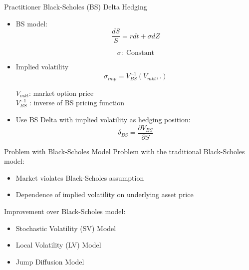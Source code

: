 \documentclass[10pt,table,mathserif]{beamer}
\begin{document}
\begin{frame}{Practitioner Black-Scholes (BS) Delta Hedging}
\begin{itemize}
  \item BS model:
\[
\frac{d S}{ S}= r dt +\sigma dZ
\]

\[
\sigma:\; \text{Constant}
\]
\item Implied volatility
  \[
  \sigma_{imp}=V_{BS}^{-1}(V_{mkt},.)
  \]
  \begin{center}
  $V_{mkt}$: market option price \\ $V_{BS}^{-1}$ : inverse of BS pricing function
  \end{center}

\item Use BS Delta with implied volatility as hedging position:
\[
\delta_{BS}=\frac{\partial V_{BS}}{ \partial S}
\]
\end{itemize}
\end{frame}






\begin{frame}{Problem with Black-Scholes Model}
Problem with the traditional Black-Scholes model:
\begin{itemize}
  \item Market violates Black-Scholes assumption
  \item Dependence of implied volatility on underlying asset price
\end{itemize}
\vspace{0.3cm}
Improvement over Black-Scholes model:
\begin{itemize}
  \item Stochastic Volatility (SV) Model
  \item Local Volatility (LV) Model
  \item Jump Diffusion Model
\end{itemize}

\end{frame}
\end{document}
